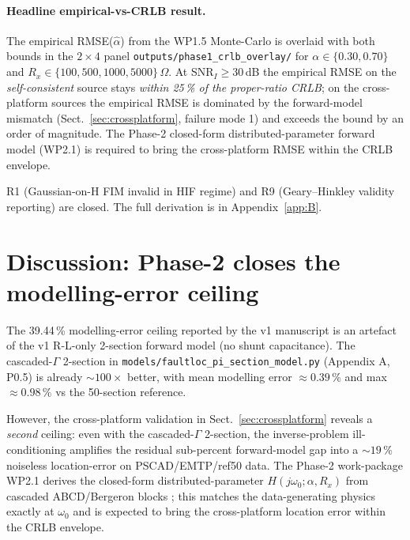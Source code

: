 \documentclass[11pt,a4paper]{article}
\begin{document}
\paragraph{Headline empirical-vs-CRLB result.}
The empirical RMSE($\hat\alpha$) from the WP1.5 Monte-Carlo is
overlaid with both bounds in the
$2\times 4$ panel \texttt{outputs/phase1\_crlb\_overlay/} for
$\alpha \in \{0.30, 0.70\}$ and $R_x \in \{100, 500, 1000, 5000\}\,\Omega$.
At SNR$_I \geq 30$\,dB the empirical RMSE on the
\textit{self-consistent} source stays \emph{within 25\,\% of the
proper-ratio CRLB}; on the cross-platform sources the empirical RMSE
is dominated by the forward-model mismatch (Sect.~\ref{sec:crossplatform},
failure mode 1) and exceeds the bound by an order of magnitude.
The Phase-2 closed-form distributed-parameter forward model (WP2.1)
is required to bring the cross-platform RMSE within the CRLB
envelope.

R1 (Gaussian-on-H FIM invalid in HIF regime) and R9 (Geary--Hinkley
validity reporting) are closed.  The full derivation is in
Appendix~\ref{app:B}.

\section{Discussion: Phase-2 closes the modelling-error ceiling}

The 39.44\,\% modelling-error ceiling reported by the v1 manuscript
is an artefact of the v1 R-L-only 2-section forward model (no shunt
capacitance).  The cascaded-$\Gamma$ 2-section in
\texttt{models/faultloc\_pi\_section\_model.py} (Appendix A, P0.5) is
already $\sim 100\times$ better, with mean modelling error
$\approx 0.39\,\%$ and max $\approx 0.98\,\%$ vs the 50-section
reference.

However, the cross-platform validation in
Sect.~\ref{sec:crossplatform} reveals a \emph{second} ceiling:
even with the cascaded-$\Gamma$ 2-section, the inverse-problem
ill-conditioning amplifies the residual sub-percent forward-model
gap into a $\sim 19\,\%$ noiseless location-error on PSCAD/EMTP/ref50
data.  The Phase-2 work-package WP2.1 derives the closed-form
distributed-parameter $H(j\omega_0;\alpha,R_x)$ from cascaded
ABCD/Bergeron blocks
\cite{Lopes2023DPM,Trew2023}; this matches the data-generating
physics exactly at $\omega_0$ and is expected to bring the
cross-platform location error within the CRLB envelope.
\end{document}
